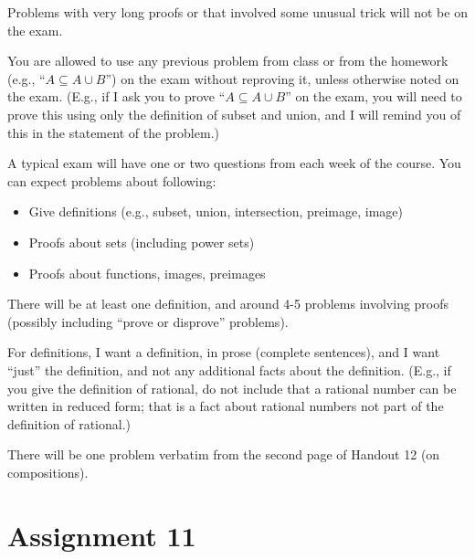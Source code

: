 \documentclass[12pt]{article}
\begin{document}
Problems with very long proofs or that involved some unusual trick will not be on the exam.
\smallskip

You are allowed to use any previous problem from class or from the homework (e.g., ``$A \subseteq A \cup B$'') on the exam without reproving it, unless otherwise noted on the exam. (E.g., if I ask you to prove ``$A \subseteq A \cup B$'' on the exam, you will need to prove this using only the definition of subset and union, and I will remind you of this in the statement of the problem.)
\smallskip

A typical exam will have one or two questions from each week of the course. You can expect problems about following:
\begin{itemize}
\item Give definitions (e.g., subset, union, intersection, preimage, image)
\item Proofs about sets (including power sets)
\item Proofs about functions, images, preimages
\end{itemize}
There will be at least one definition, and around 4-5 problems involving proofs (possibly including ``prove or disprove'' problems).
\smallskip


For definitions, I want a definition, in prose (complete sentences), and I want ``just'' the definition, and not any additional facts about the definition. (E.g., if you give the definition of rational, do not include that a rational number can be written in reduced form; that is a fact about rational numbers not part of the definition of rational.)
\smallskip

There will be one problem verbatim from the second page of Handout 12 (on compositions).






 
\newpage
\section[11 (due \csname dateWeek11\endcsname): Inverse functions.]{Assignment 11}
\end{document}

